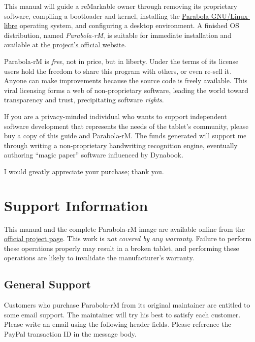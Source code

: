 \documentclass{memoir}
\begin{document}
This manual will guide a reMarkable owner through removing its proprietary software, compiling a bootloader and kernel, installing the \href{https://www.parabola.nu/}{Parabola GNU/Linux-libre} operating system, and configuring a desktop environment. A finished OS distribution, named \textit{Parabola-rM}, is suitable for immediate installation and available at \href{http://www.davisr.me/projects/parabola-rm/}{the project's official website}.

Parabola-rM is \textit{free}, not in price, but in liberty. Under the terms of its license users hold the freedom to share this program with others, or even re-sell it. Anyone can make improvements because the source code is freely available. This viral licensing forms a web of non-proprietary software, leading the world toward transparency and trust, precipitating software \textit{rights}.

If you are a privacy-minded individual who wants to support independent software development that represents the needs of the tablet's community, please buy a copy of this guide and Parabola-rM. The funds generated will support me through writing a non-proprietary handwriting recognition engine, eventually authoring ``magic paper'' software influenced by Dynabook.

I would greatly appreciate your purchase; thank you.

\vspace{1.5cm}



\chapter{Support Information}
This manual and the complete Parabola-rM image are available online from the \href{http://www.davisr.me/projects/parabola-rm/}{official project page}. This work is \textit{not covered by any warranty}. Failure to perform these operations properly may result in a broken tablet, and performing these operations are likely to invalidate the manufacturer's warranty.

\section{General Support}

Customers who purchase Parabola-rM from its original maintainer are entitled to some email support. The maintainer will try his best to satisfy each customer. Please write an email using the following header fields. Please reference the PayPal transaction ID in the message body.
\end{document}
